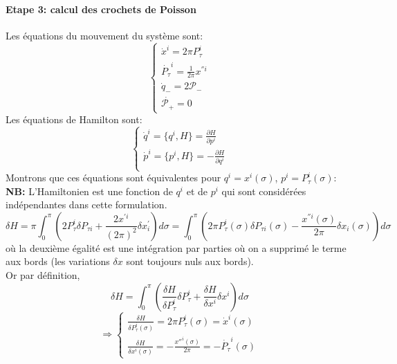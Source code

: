 \documentclass[a4paper,12pt]{article}
\def\CP{\mathcal{P}}
\def\pt{P_\tau}
\begin{document}
\paragraph*{Etape 3: calcul des crochets de Poisson}
Les équations du mouvement du système sont:
\begin{equation}
	\left\lbrace
    \begin{aligned}
   		\dot{x}^i=2\pi\pt^i\\
		\dot{\pt}^i=\frac{1}{2\pi}x^{'' i}\\
		\dot{q}_-=2\CP_-\\
		\dot{\CP_+}=0
     \end{aligned}
     \right.
\end{equation}
Les équations de Hamilton sont:
\begin{equation}
	\left\lbrace
    \begin{aligned}
		\dot{q}^i=\{q^i,H\}=\frac{\partial H}{\partial p^i}\\
		\dot{p}^i=\{p^i,H\}=-\frac{\partial H}{\partial q^i}\\
     \end{aligned}
     \right.
\end{equation}
 Montrons que ces équations sont équivalentes pour $q^i=x^i(\sigma)$, $p^i=\pt^i(\sigma)$:\\
\textbf{NB:} L'Hamiltonien est une fonction de $q^i$ et de $p^i$ qui sont considérées indépendantes dans cette formulation. \\
\begin{equation*}
\delta H = \pi\int_0^\pi\left(2\pt^i \delta P_{\tau i} +\frac{2x^{'i}}{(2\pi)^2}\delta x^{'}_{i}\right) d\sigma=\int_0^\pi \left( 2\pi\pt^i(\sigma) \delta P_{\tau i}(\sigma) -\frac{x^{''i}(\sigma)}{2\pi}\delta x_{i}(\sigma)\right)  d\sigma 
\end{equation*}
où la deuxième égalité est une intégration par parties où on a supprimé le terme aux bords (les variations $\delta x$ sont toujours nuls aux bords).\\
Or par définition,
\begin{equation*}
\delta H=\int_0^\pi\left( \frac{\delta H}{\delta \pt^i}\delta \pt^i + \frac{\delta H}{\delta x^i}\delta x^i\right)d \sigma
\end{equation*}
\begin{equation*}
\Rightarrow
\left\lbrace
\begin{aligned}
\frac{\delta H}{\delta \pt^i(\sigma)}=2\pi \pt^i (\sigma)= \dot{x}^i(\sigma)\\
\frac{\delta H}{\delta x^i(\sigma)}= -\frac{x''^i(\sigma)}{2\pi}=-\dot{\pt}^i(\sigma)
\end{aligned}
\right.
\end{equation*}
\end{document}
